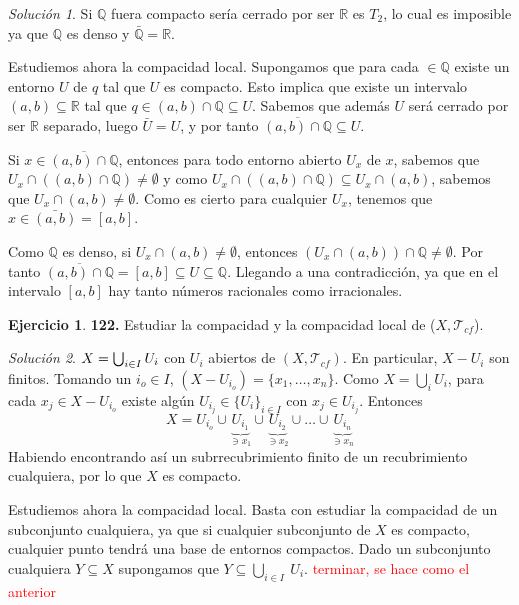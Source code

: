 \documentclass[12pt,twoside]{report}
\newcommand\mc[1]{\mathcal{#1}}
\theoremstyle{azul}
\theoremstyle{azul2}
\theoremstyle{plain}
\theoremstyle{definition}
\newtheorem*{ejer}{Ejercicio}
\theoremstyle{remark}
\newtheorem*{sol}{Solución}
\begin{document}
\begin{sol}
Si $\mathbb{Q}$ fuera compacto sería cerrado por ser $\mathbb{R}$ es $T_2$, lo cual es imposible ya que $\mathbb{Q}$ es denso y $\bar{\mathbb{Q}}=\mathbb{R}$.

Estudiemos ahora la compacidad local. Supongamos que para cada $\in\mathbb{Q}$ existe un entorno $U$ de $q$ tal que $U$ es compacto. Esto implica que existe un intervalo $(a,b)\subseteq \mathbb{R}$ tal que $q\in (a,b)\cap \mathbb{Q}\subseteq U$. Sabemos que además $U$ será cerrado por ser $\mathbb{R}$ separado, luego $\bar{U}=U$, y por tanto $\overline{(a,b)\cap \mathbb{Q}}\subseteq U$.

Si $x\in \overline{(a,b)\cap \mathbb{Q}} $, entonces para todo entorno abierto $U_x$ de $x$, sabemos que $U_x\cap ((a,b)\cap \mathbb{Q})\neq \emptyset$ y como $U_x\cap ((a,b)\cap \mathbb{Q})\subseteq U_x\cap (a,b)$, sabemos que $ U_x\cap (a,b)\neq \emptyset$. Como es cierto para cualquier $U_x$, tenemos que $x\in \bar{(a,b)}=[a,b]$.

Como $\mathbb{Q}$ es denso, si $ U_x\cap (a,b)\neq \emptyset$, entonces $( U_x\cap (a,b))\cap \mathbb{Q}\neq \emptyset$. Por tanto $\overline{(a,b)\cap \mathbb{Q}}=[a,b]\subseteq U\subseteq \mathbb{Q}$. Llegando a una contradicción, ya que en el intervalo $[a,b]$ hay tanto números racionales como irracionales.
\end{sol}
\begin{ejer}
    \textbf{122.} Estudiar la compacidad y la compacidad local de ($X, \mc{T}_{cf}$).
\end{ejer}
\begin{sol}
    $X = \bigcup_{i \in I} U_i \displaystyle$ con $U_i$ abiertos de $(X, \mc{T}_{cf})$. En particular, $X-U_i$ son finitos. Tomando un $i_o \in I$, $(X-U_{i_o})=\{x_1, \ldots, x_n\}$. 
    Como $X=\bigcup_i U_i$, para cada $x_j \in X-U_{i_o}$ existe algún $U_{i_j}\in \{U_i\}_{i \in I}$ con $x_j \in U_{i_j}$. Entonces $$X= U_{i_o}\cup \underbrace{U_{i_1}}_{\ni x_1}\cup\underbrace{U_{i_2}}_{\ni x_2}\cup \ldots \cup \underbrace{U_{i_n}}_{\ni x_n}$$
    Habiendo encontrando así un subrrecubrimiento finito de un recubrimiento cualquiera, por lo que $X$ es compacto.

    Estudiemos ahora la compacidad local. Basta con estudiar la compacidad de un subconjunto cualquiera, ya que si cualquier subconjunto de $X$ es compacto, cualquier punto tendrá una base de entornos compactos. Dado un subconjunto cualquiera $Y\subseteq X$ supongamos que $Y \subseteq \underset{i\in I}{\bigcup}\: U_i$. \textcolor{red}{terminar, se hace como el anterior}

\end{sol}
\end{document}
